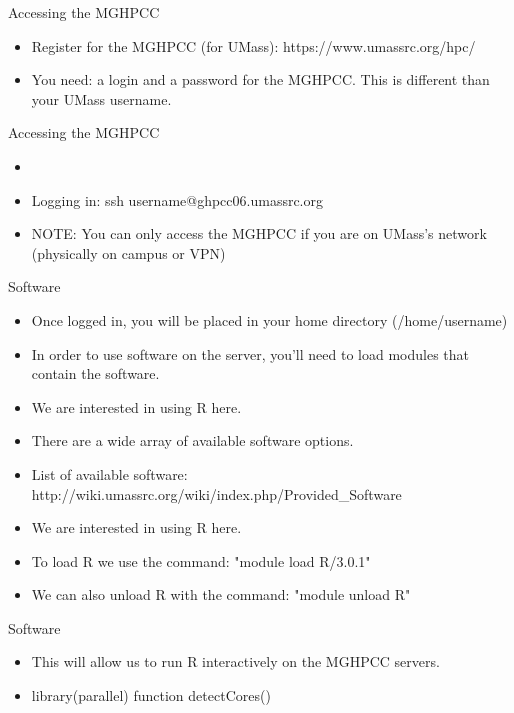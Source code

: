 \begin{frame}{Accessing the MGHPCC}
\begin{itemize}
\item Register for the MGHPCC (for UMass): https://www.umassrc.org/hpc/
\item You need: a login and a password for the MGHPCC. This is different than your UMass username.
\end{itemize}
\end{frame}


\begin{frame}{Accessing the MGHPCC}
\begin{itemize}
\item \item Logging in: ssh username@ghpcc06.umassrc.org
\item NOTE: You can only access the MGHPCC if you are on UMass's network (physically on campus or VPN)
\end{itemize}
\end{frame}


\begin{frame}{Software}
\begin{itemize}
\item Once logged in, you will be placed in your home directory (/home/username)
\item In order to use software on the server, you'll need to load modules that contain the software.  
\item We are interested in using R here.  
\item There are a wide array of available software options.  
\item List of available software: http://wiki.umassrc.org/wiki/index.php/Provided\_Software
\item We are interested in using R here.  
\item To load R we use the command: "module load R/3.0.1"
\item We can also unload R with the command:  "module unload R"
\end{itemize}
\end{frame}

\begin{frame}{Software}
\begin{itemize}
\item This will allow us to run R interactively on the MGHPCC servers.  
\item library(parallel) function detectCores()
\end{itemize}
\end{frame}

